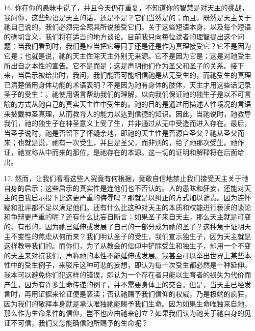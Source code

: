 16. 你在你的愚昧中说了，并且今天仍在重复，不知道你的智慧是对天主的挑战，我问你，这些短语是天主的话，还是不是？它们当然是的；而且，既然是天主关于祂自己说的，我们必须完全照其所说接受它们。关于这些短语本身，以及每个短语的确切含义，我们将在适当的地方谈论。目前我只向每位读者的理智提出这个问题：当我们看到时，我们是应当把它等同于还是还是作为真理接受它？它不是因为它是；也就是说，祂的天主性除天主外别无来源。它不是因为它是；这是对祂受生所出自之本性的宣告。它不是而是；这是声明他们作为圣父和圣子的关系。接下来，当启示被给出时，我问，我们能否可能相信祂是从无受生的，而祂受生的真理已清楚借用身体功能的术语表明？不是因为祂有身体的肢体，天主才用这些话记录圣子的受生：。祂使用语言帮助我们的理解，以向我们保证祂的独生子是以不可言喻的方式从祂自己的真实天主性中受生的。祂的目的是通过用描述人性境况的言语来披戴神圣真理，从而教育人的能力以达到信德的知识。因此，当祂说时，祂教导我们，祂的独生子在神圣意义上受了生，并非通过从无中受造而进入存在。最后，当圣子说时，祂是否留下了怀疑余地，即祂的天主性是否源自圣父？祂从圣父而来；也就是说，祂有一次受生，并且是圣父，而非别的，给了祂那次受生。祂作证，祂宣称从中而来的那位，是祂存在的本源。这一切的证明和解释将在后面给出。\par

17. 然而，让我们看看这些人究竟有何根据，竟敢自信地禁止我们接受天主关于祂自身的启示；这些启示的真实性是连他们也不否认的。人的愚昧和狂妄，还能对天主的自我启示投下比这更严重的侮辱吗？那就是以纠正的方式加以谴责。因为连怀疑和批评都不足以满足他们。还有什么比这种对天主的本质和权能进行亵渎的谈论和争辩更严重的呢？还有什么比妄自断言：如果圣子来自天主，那么天主就是可变的、有形的，因为祂已延伸或发展了自己的一部分成为祂的圣子？这种急于证明天主不变性的焦虑从何而来？我们明认圣子的受生，我们宣示独生子，因为天主就是这样教导我们的。而你们，为了从教会的信仰中铲除受生和独生子，却用一个不变的天主来对抗我们，声称祂的本性不能延伸或发展。我甚至可以举出世界上某些本性中的受生例子，来驳斥这种可悲的妄想，即认为每一次受生都必然是一种延伸。我本可以避免你们犯这样的错误，即认为一个存在者只能以生育者的损失为代价而产生，因为有许多生命传递的例子，并不需要身体上的交合。但是，当天主已经发言时，再用证据来论证便是亵渎；否认祂赐予我们信仰的权威，乃是极端的疯狂，因为我们的敬拜本身就是承认唯独祂能赐予我们生命。因为如果生命唯独来自祂，那么作为生命条件的信仰，岂不也应由祂来创立？如果我们认为祂关于祂自身的见证不可信，我们又怎能确信祂所赐予的生命呢？\par

